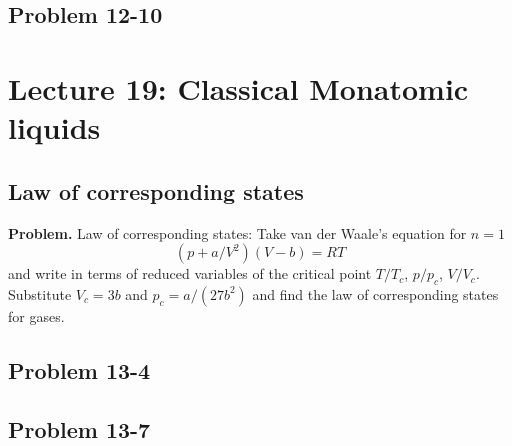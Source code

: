 \documentclass[twocolumn, 10pt]{article}
\numberwithin{equation}{section}
\newenvironment{problem}
{\par\medskip\sffamily \color{problue}
  \textbf{Problem. }\ignorespaces}
{\medskip}
\begin{document}
\subsection{Problem 12-10}


\section{Lecture 19: Classical Monatomic liquids}

\subsection{Law of corresponding states}

\begin{problem}
Law of corresponding states: Take van der Waale's
equation for $n = 1$
$$
(p + a/V^2)(V - b) = RT
$$
and write in terms of reduced variables of
the critical point $T/T_c$, $p/p_c$, $V/V_c$.
%
Substitute $V_c = 3b$ and $p_c = a/(27b^2)$
and find the law of corresponding states for gases.
\end{problem}



\subsection{Problem 13-4}

\subsection{Problem 13-7}

%
%
%
%
\end{document}
